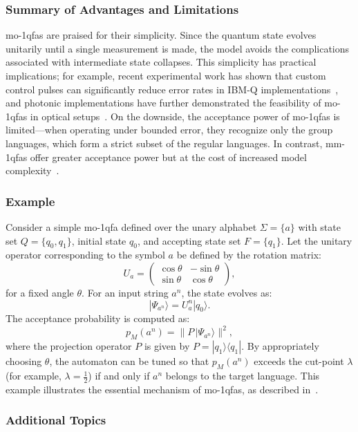 \subsubsection{Summary of Advantages and Limitations}
\gls{mo-1qfa}s are praised for their simplicity. Since the quantum state evolves unitarily until a single measurement is made, the model avoids the complications associated with intermediate state collapses. This simplicity has practical implications; for example, recent experimental work has shown that custom control pulses can significantly reduce error rates in IBM-Q implementations~\cite{lussi2024implementingquantumfiniteautomaton}, and photonic implementations have further demonstrated the feasibility of \gls{mo-1qfa}s in optical setups~\cite{app11188768}. On the downside, the acceptance power of \gls{mo-1qfa}s is limited—when operating under bounded error, they recognize only the group languages, which form a strict subset of the regular languages. In contrast, \glspl{mm-1qfa} offer greater acceptance power but at the cost of increased model complexity~\cite{646094,10.1007/3-540-44669-9_10}.

\subsubsection{Example}
Consider a simple \gls{mo-1qfa} defined over the unary alphabet $\Sigma=\{a\}$ with state set $Q=\{q_0,q_1\}$, initial state $q_0$, and accepting state set $F=\{q_1\}$. Let the unitary operator corresponding to the symbol $a$ be defined by the rotation matrix:
\[
U_a = \begin{pmatrix}
\cos\theta & -\sin\theta \\
\sin\theta & \cos\theta
\end{pmatrix},
\]
for a fixed angle $\theta$. For an input string $a^n$, the state evolves as:
\[
|\Psi_{a^n}\rangle = U_a^n |q_0\rangle.
\]
The acceptance probability is computed as:
\[
p_M(a^n)=\|P\,|\Psi_{a^n}\rangle\|^2,
\]
where the projection operator $P$ is given by $P=|q_1\rangle\langle q_1|$. By appropriately choosing $\theta$, the automaton can be tuned so that $p_M(a^n)$ exceeds the cut-point $\lambda$ (for example, $\lambda=\frac{1}{2}$) if and only if $a^n$ belongs to the target language. This example illustrates the essential mechanism of \gls{mo-1qfa}s, as described in~\cite{moore2000quantum,brodsky2002characterizations}.

\subsubsection{Additional Topics}
